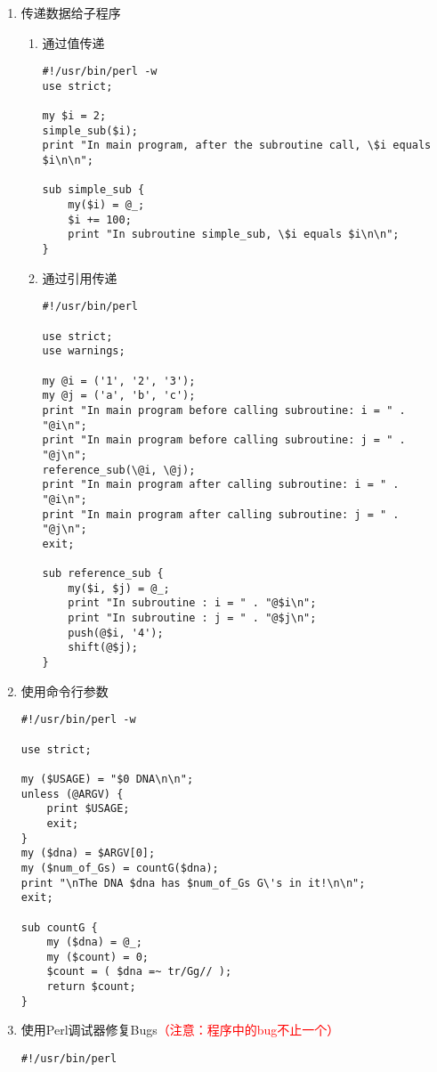 \documentclass{TIJMUjiaoanSY}
\begin{document}
\begin{enumerate}
\begin{enumerate}
\begin{verbatim}
sub A_to_T {
    my ($input) = @_;
    my $dna = $input;
    $dna =~ s/A/T/g;
    return $dna;
}
\end{verbatim}
      \item 传递数据给子程序
	\begin{enumerate}
	  \item 通过值传递
\begin{verbatim}
#!/usr/bin/perl -w
use strict;

my $i = 2;
simple_sub($i);
print "In main program, after the subroutine call, \$i equals $i\n\n";

sub simple_sub {
    my($i) = @_;
    $i += 100;
    print "In subroutine simple_sub, \$i equals $i\n\n";
}
\end{verbatim}

\otherTail
\newpage
\otherHeader

	  \item 通过引用传递
\begin{verbatim}
#!/usr/bin/perl

use strict;
use warnings;

my @i = ('1', '2', '3');
my @j = ('a', 'b', 'c');
print "In main program before calling subroutine: i = " .  "@i\n";
print "In main program before calling subroutine: j = " .  "@j\n";
reference_sub(\@i, \@j);
print "In main program after calling subroutine: i = " .  "@i\n";
print "In main program after calling subroutine: j = " .  "@j\n";
exit;

sub reference_sub {
    my($i, $j) = @_;
    print "In subroutine : i = " . "@$i\n";
    print "In subroutine : j = " . "@$j\n";
    push(@$i, '4');
    shift(@$j);
}
\end{verbatim}
	\end{enumerate}
      \item 使用命令行参数
\begin{verbatim}
#!/usr/bin/perl -w

use strict;

my ($USAGE) = "$0 DNA\n\n";
unless (@ARGV) {
    print $USAGE;
    exit;
}
my ($dna) = $ARGV[0];
my ($num_of_Gs) = countG($dna);
print "\nThe DNA $dna has $num_of_Gs G\'s in it!\n\n";
exit;

sub countG {
    my ($dna) = @_;
    my ($count) = 0;
    $count = ( $dna =~ tr/Gg// );
    return $count;
}
\end{verbatim}

\otherTail
\newpage
\otherHeader

      \item 使用Perl调试器修复Bugs\textcolor{red}{（注意：程序中的bug不止一个）}
\begin{verbatim}
#!/usr/bin/perl


\end{verbatim}
\end{enumerate}
\end{enumerate}
\end{document}
